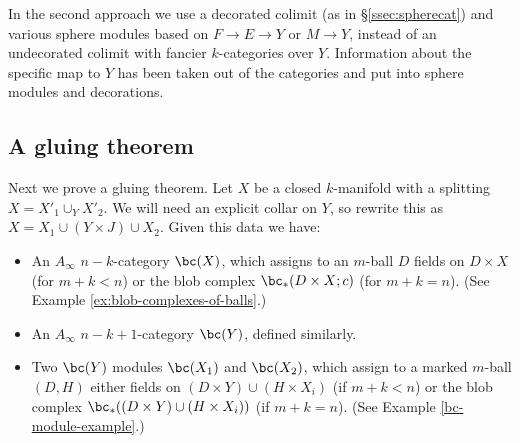 \medskip

In the second approach we use a decorated colimit (as in \S \ref{ssec:spherecat}) 
and various sphere modules based on $F \to E \to Y$
or $M\to Y$, instead of an undecorated colimit with fancier $k$-categories over $Y$.
Information about the specific map to $Y$ has been taken out of the categories
and put into sphere modules and decorations.

%
%
%
%
%
%
%


\subsection{A gluing theorem}
\label{sec:gluing}

Next we prove a gluing theorem.
Let $X$ be a closed $k$-manifold with a splitting $X = X'_1\cup_Y X'_2$.
We will need an explicit collar on $Y$, so rewrite this as
$X = X_1\cup (Y\times J) \cup X_2$.
Given this data we have:
\begin{itemize}
\item An $A_\infty$ $n{-}k$-category $\bc(X)$, which assigns to an $m$-ball
$D$ fields on $D\times X$ (for $m+k < n$) or the blob complex $\bc_*(D\times X; c)$
(for $m+k = n$).
(See Example \ref{ex:blob-complexes-of-balls}.)
\item An $A_\infty$ $n{-}k{+}1$-category $\bc(Y)$, defined similarly.
\item Two $\bc(Y)$ modules $\bc(X_1)$ and $\bc(X_2)$, which assign to a marked
$m$-ball $(D, H)$ either fields on $(D\times Y) \cup (H\times X_i)$ (if $m+k < n$)
or the blob complex $\bc_*((D\times Y) \cup (H\times X_i))$ (if $m+k = n$).
(See Example \ref{bc-module-example}.)
\end{itemize}


